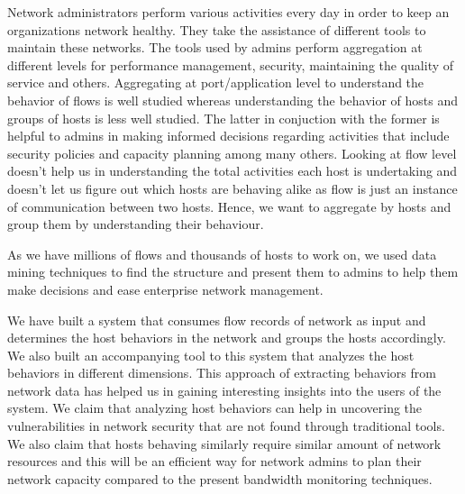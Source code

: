 
Network administrators perform various activities every day in order to keep an organizations network healthy. They take the assistance of different tools to maintain these networks. The tools used by admins perform aggregation at different levels for performance management, security, maintaining the quality of service and others. Aggregating at port/application level to understand the behavior of flows is well studied whereas understanding the behavior of hosts and groups of hosts is less well studied. The latter in conjuction with the former is helpful to admins in making
informed decisions regarding activities that include security policies and capacity planning among
many others. Looking at flow level doesn't help us in understanding the total activities each host is
undertaking and doesn't let us figure out which hosts are behaving alike as flow is just an instance of
communication between two hosts. Hence, we want to aggregate by hosts and group them by
understanding their behaviour.

As we have millions of flows and thousands of hosts to work on, we used data mining techniques to find the structure and present them to admins to help them
make decisions and ease enterprise network management.

We have built a system that consumes flow records of network as input and determines the host behaviors in the network and groups the hosts accordingly. We also built an accompanying tool to this system that analyzes the host behaviors in different dimensions. This approach of extracting behaviors from network data has helped us in gaining interesting insights into the users of the system. We claim that analyzing host behaviors can help in uncovering the vulnerabilities in network security that are not found through traditional tools. We also claim that hosts behaving similarly require similar amount of network resources and this will be an efficient way for network admins to plan their network capacity compared to the present bandwidth monitoring techniques.   